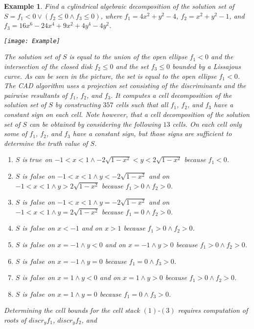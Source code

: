 \documentclass[english]{amsart}
\numberwithin{equation}{section}
\numberwithin{figure}{section}
\newtheorem{example}[thm]{Example}
\begin{document}
\begin{example}
\label{exa:MainExample}Find a cylindrical algebraic decomposition
of the solution set of $S=f_{1}<0\vee(f_{2}\leq0\wedge f_{3}\leq0)$,
where $f_{1}=4x^{2}+y^{2}-4$, $f_{2}=x^{2}+y^{2}-1$, and $f_{3}=16x^{6}-24x^{4}+9x^{2}+4y^{4}-4y^{2}$.

\texttt{[image: Example]}

The solution set of $S$ is equal to the union of the open ellipse
$f_{1}<0$ and the intersection of the closed disk $f_{2}\leq0$ and
the set $f_{3}\leq0$ bounded by a Lissajous curve. As can be seen
in the picture, the set is equal to the open ellipse $f_{1}<0$. The
CAD algorithm uses a projection set consisting of the discriminants
and the pairwise resultants of $f_{1}$, $f_{2}$, and $f_{3}$. It
computes a cell decomposition of the solution set of $S$ by constructing
$357$ cells such that all $f_{1}$, $f_{2}$, and $f_{3}$ have a
constant sign on each cell. Note however, that a cell decomposition
of the solution set of $S$ can be obtained by considering the following
$13$ cells. On each cell only some of $f_{1}$, $f_{2}$, and $f_{3}$
have a constant sign, but those signs are sufficient to determine
the truth value of $S$.
\begin{enumerate}
\item $S$ is $true$ on $-1<x<1\wedge-2\sqrt{1-x^{2}}<y<2\sqrt{1-x^{2}}$
because $f_{1}<0$.
\item $S$ is $false$ on $-1<x<1\wedge y<-2\sqrt{1-x^{2}}$ and on $-1<x<1\wedge y>2\sqrt{1-x^{2}}$
because $f_{1}>0\wedge f_{2}>0$.
\item $S$ is $false$ on $-1<x<1\wedge y=-2\sqrt{1-x^{2}}$ and on $-1<x<1\wedge y=2\sqrt{1-x^{2}}$
because $f_{1}=0\wedge f_{2}>0$.
\item $S$ is $false$ on $x<-1$ and on $x>1$ because $f_{1}>0\wedge f_{2}>0$.
\item $S$ is $false$ on $x=-1\wedge y<0$ and on $x=-1\wedge y>0$ because
$f_{1}>0\wedge f_{2}>0$.
\item $S$ is $false$ on $x=-1\wedge y=0$ because $f_{1}=0\wedge f_{3}>0$.
\item $S$ is $false$ on $x=1\wedge y<0$ and on $x=1\wedge y>0$ because
$f_{1}>0\wedge f_{2}>0$.
\item $S$ is $false$ on $x=1\wedge y=0$ because $f_{1}=0\wedge f_{3}>0$.
\end{enumerate}
Determining the cell bounds for the cell stack $(1)$-$(3)$ requires
computation of roots of $discr_{y}f_{1}$, $discr_{y}f_{2}$, and

\end{example}
\end{document}
